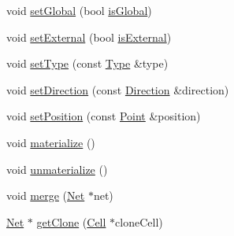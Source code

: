\begin{DoxyCompactItemize}
\item 
void \hyperlink{classHurricane_1_1Net_a35c84afd9dade0cb715602bcf8ec8865}{set\+Global} (bool \hyperlink{classHurricane_1_1Net_a332e9b311809f75fc0fa3a5f36acebcc}{is\+Global})
\item 
void \hyperlink{classHurricane_1_1Net_a6a30bc8282ce7e4b936e73a11549fedf}{set\+External} (bool \hyperlink{classHurricane_1_1Net_aeeb3735dd7451bc0054dd68ac21aae47}{is\+External})
\item 
void \hyperlink{classHurricane_1_1Net_a83f5ce12291b0ec5ab584d515dd8963c}{set\+Type} (const \hyperlink{classHurricane_1_1Net_1_1Type}{Type} \&type)
\item 
void \hyperlink{classHurricane_1_1Net_ac33d13bb0ddc60f369d5bfcffc4bb0f8}{set\+Direction} (const \hyperlink{classHurricane_1_1Net_1_1Direction}{Direction} \&direction)
\item 
void \hyperlink{classHurricane_1_1Net_a0a3a3232a74ebced14b14029c5199561}{set\+Position} (const \hyperlink{classHurricane_1_1Point}{Point} \&position)
\item 
void \hyperlink{classHurricane_1_1Net_ae46f7e4a9b00b265c06cb6e0ee00b806}{materialize} ()
\item 
void \hyperlink{classHurricane_1_1Net_a9e53a3d54b61f7081263e6d7b4fa81b9}{unmaterialize} ()
\item 
void \hyperlink{classHurricane_1_1Net_a442f62d23364805f39816cd543284886}{merge} (\hyperlink{classHurricane_1_1Net}{Net} $\ast$net)
\item 
\hyperlink{classHurricane_1_1Net}{Net} $\ast$ \hyperlink{classHurricane_1_1Net_a4bd27e6ae22606463491c28437c4068f}{get\+Clone} (\hyperlink{classHurricane_1_1Cell}{Cell} $\ast$clone\+Cell)
\end{DoxyCompactItemize}

